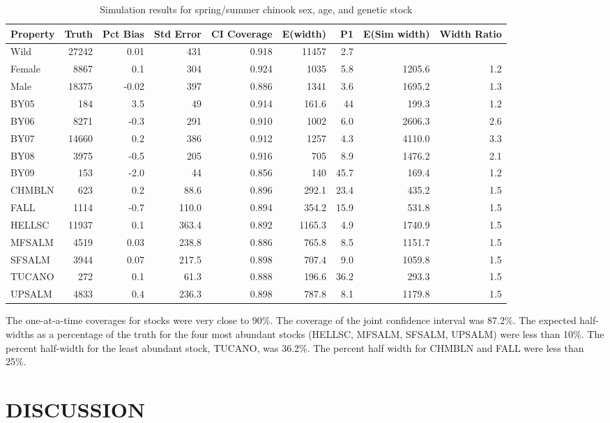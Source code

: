\documentclass[12pt]{article}
\begin{document}
\begin{table} %
\caption{Simulation results for spring/summer chinook sex, age, and genetic stock}
\label{table:CHsimresults}
\footnotesize
\begin{tabular}{ | l | r | r | r | r | r | r | r | r | }
\hline
Property&Truth&Pct Bias&Std Error&CI Coverage&E(width)&P1&E(Sim width)&Width Ratio \\ \hline
Wild&27242&0.01&431&0.918&11457&2.7&& \\ \hline
Female&8867&0.1&304&0.924&1035&5.8&1205.6&1.2 \\ \hline
Male&18375&-0.02&397&0.886&1341&3.6&1695.2&1.3 \\ \hline
BY05&184&3.5&49&0.914&161.6&44&199.3&1.2 \\ \hline
BY06&8271&-0.3&291&0.910&1002&6.0&2606.3&2.6 \\ \hline
BY07&14660&0.2&386&0.912&1257&4.3&4110.0&3.3 \\ \hline
BY08&3975&-0.5&205&0.916&705&8.9&1476.2&2.1 \\ \hline
BY09&153&-2.0&44&0.856&140&45.7&169.4&1.2 \\ \hline
CHMBLN&623&0.2&88.6&0.896&292.1&23.4&435.2&1.5 \\ \hline
FALL&1114&-0.7&110.0&0.894&354.2&15.9&531.8&1.5 \\ \hline
HELLSC&11937&0.1&363.4&0.892&1165.3&4.9&1740.9&1.5 \\ \hline
MFSALM&4519&0.03&238.8&0.886&765.8&8.5&1151.7&1.5 \\ \hline
SFSALM&3944&0.07&217.5&0.898&707.4&9.0&1059.8&1.5 \\ \hline
TUCANO&272&0.1&61.3&0.888&196.6&36.2&293.3&1.5 \\ \hline
UPSALM&4833&0.4&236.3&0.898&787.8&8.1&1179.8&1.5 \\ \hline
\end{tabular}
\end{table}

The one-at-a-time coverages for stocks were very close to 90\%. The coverage of the joint confidence interval was 87.2\%. The expected half-widths as a percentage of the truth for the four most abundant stocks (HELLSC, MFSALM, SFSALM, UPSALM) were less than 10\%. The percent half-width for the least abundant stock, TUCANO, was 36.2\%. The percent half width for CHMBLN and FALL were less than 25\%.

\section{DISCUSSION}	
\end{document}
